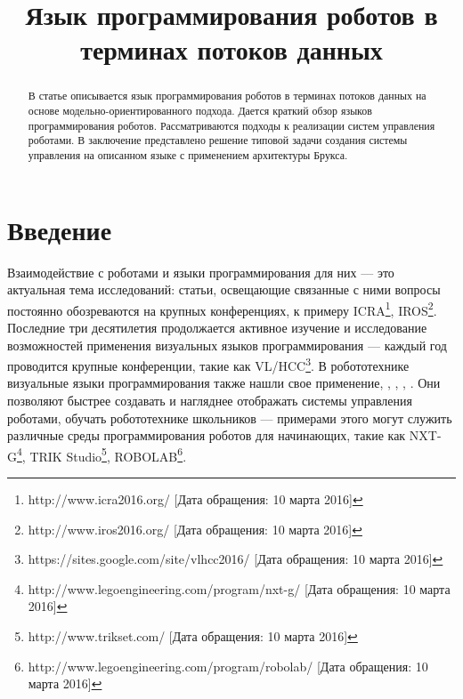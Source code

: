 \documentclass[conference]{IEEEtran}
\begin{document}
\title{Язык программирования роботов в терминах потоков данных}

\author{
	
	\and

}

\maketitle


\begin{abstract}
В статье описывается язык программирования роботов в терминах потоков данных на основе модельно-ориентированного подхода. Дается краткий обзор языков программирования роботов. Рассматриваются подходы к реализации систем управления роботами.  В заключение представлено решение типовой задачи создания системы управления на описанном языке с применением архитектуры Брукса. 
\end{abstract}

\section{Введение}
Взаимодействие с роботами и языки программирования для них --- это актуальная тема исследований: статьи, освещающие связанные с ними вопросы постоянно обозреваются на крупных конференциях, к примеру ICRA\footnote{http://www.icra2016.org/ [Дата обращения: 10 марта 2016]}, IROS\footnote{http://www.iros2016.org/ [Дата обращения: 10 марта 2016]}. Последние три десятилетия продолжается активное изучение и исследование возможностей применения  визуальных языков программирования --- каждый год проводится крупные конференции, такие как VL/HCC\footnote{https://sites.google.com/site/vlhcc2016/ [Дата обращения: 10 марта 2016]}. В робототехнике визуальные языки программирования также нашли свое применение\cite{banyasad2000visual}, \cite{simpson2006mobile}, \cite{simpson2008visual}, \cite{posso2011process}, \cite{diprose2011ruru}. Они позволяют быстрее создавать и нагляднее отображать системы управления роботами, обучать робототехнике школьников --- примерами этого могут служить различные среды программирования роботов для начинающих, такие как NXT-G\footnote{http://www.legoengineering.com/program/nxt-g/ [Дата обращения: 10 марта 2016]}, TRIK Studio\footnote{http://www.trikset.com/ [Дата обращения: 10 марта 2016]}, ROBOLAB\footnote{http://www.legoengineering.com/program/robolab/ [Дата обращения: 10 марта 2016]}. 
\end{document}
